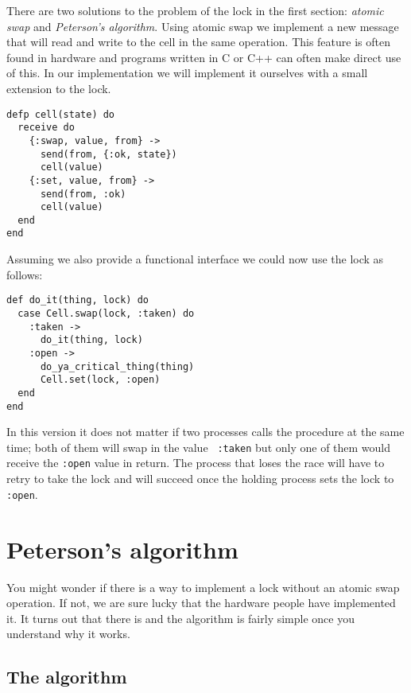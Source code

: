\documentclass[a4paper,11pt]{article}
\begin{document}
There are two solutions to the problem of the lock in the first
section: {\em atomic swap} and {\em Peterson's algorithm}. Using atomic
swap we implement a new message that will read and write to the cell
in the same operation. This feature is often found in hardware and
programs written in C or C++ can often make direct use of this. In our
implementation we will implement it ourselves with a small extension to the lock. 

\begin{verbatim}
defp cell(state) do
  receive do
    {:swap, value, from} ->
      send(from, {:ok, state})
      cell(value)
    {:set, value, from} ->
      send(from, :ok)
      cell(value)
  end
end
\end{verbatim}

Assuming we also provide a functional interface we could now use the lock as follows:

\pagebreak

\begin{verbatim}
def do_it(thing, lock) do
  case Cell.swap(lock, :taken) do
    :taken ->
      do_it(thing, lock)
    :open ->
      do_ya_critical_thing(thing)
      Cell.set(lock, :open)
  end
end
\end{verbatim}

In this version it does not matter if two processes calls the
procedure at the same time; both of them will swap in the value {\tt
  :taken} but only one of them would receive the {\tt :open} value in
return. The process that loses the race will have to retry to take
the lock and will succeed once the holding process sets the lock to
{\tt :open}.



\section{Peterson's algorithm}

You might wonder if there is a way to implement a lock without an
atomic swap operation. If not, we are sure lucky that the hardware
people have implemented it. It turns out that there is and the
algorithm is fairly simple once you understand why it works.


\subsection{The algorithm}
\end{document}
